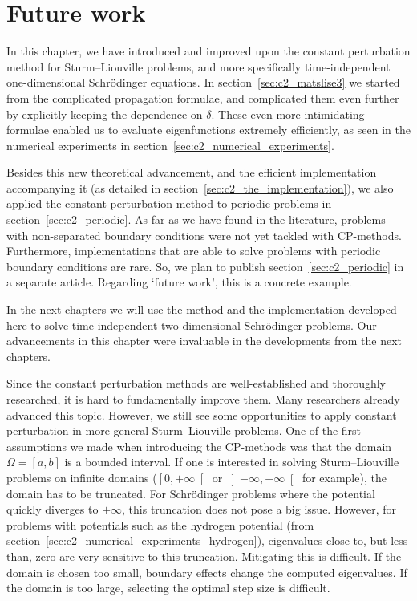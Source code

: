

\section{Future work}

In this chapter, we have introduced and improved upon the constant perturbation method for Sturm--Liouville problems, and more specifically time-independent one-dimensional Schrödinger equations. In section~\ref{sec:c2_matslise3} we started from the complicated propagation formulae, and complicated them even further by explicitly keeping the dependence on $\delta$. These even more intimidating formulae enabled us to evaluate eigenfunctions extremely efficiently, as seen in the numerical experiments in section~\ref{sec:c2_numerical_experiments}.

Besides this new theoretical advancement, and the efficient implementation accompanying it (as detailed in section~\ref{sec:c2_the_implementation}), we also applied the constant perturbation method to periodic problems in section~\ref{sec:c2_periodic}. As far as we have found in the literature, problems with non-separated boundary conditions were not yet tackled with CP-methods. Furthermore, implementations that are able to solve problems with periodic boundary conditions are rare. So, we plan to publish section~\ref{sec:c2_periodic} in a separate article. Regarding `future work', this is a concrete example.

In the next chapters we will use the method and the implementation developed here to solve time-independent two-dimensional Schrödinger problems. Our advancements in this chapter were invaluable in the developments from the next chapters.

Since the constant perturbation methods are well-established and thoroughly researched, it is hard to fundamentally improve them. Many researchers already advanced this topic. However, we still see some opportunities to apply constant perturbation in more general Sturm--Liouville problems. One of the first assumptions we made when introducing the CP-methods was that the domain $\Omega = [a, b]$ is a bounded interval. If one is interested in solving Sturm--Liouville problems on infinite domains ($\left[0, +\infty\right[$ or $\left]-\infty, +\infty\right[$ for example), the domain has to be truncated. For Schrödinger problems where the potential quickly diverges to $+\infty$, this truncation does not pose a big issue. However, for problems with potentials such as the hydrogen potential (from section~\ref{sec:c2_numerical_experiments_hydrogen}), eigenvalues close to, but less than, zero are very sensitive to this truncation. Mitigating this is difficult. If the domain is chosen too small, boundary effects change the computed eigenvalues. If the domain is too large, selecting the optimal step size is difficult.

